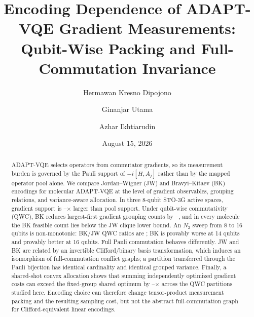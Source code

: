 \documentclass[aps,pra,twocolumn,superscriptaddress,nofootinbib,floatfix]{revtex4-2}
\begin{document}
\title{Encoding Dependence of ADAPT-VQE Gradient Measurements:\\
Qubit-Wise Packing and Full-Commutation Invariance}

\author{Hermawan Kresno Dipojono}
\author{Ginanjar Utama}
\author{Azhar Ikhtiarudin}
\date{August 15, 2026}

\begin{abstract}
ADAPT-VQE selects operators from commutator gradients, so its measurement burden is governed by the Pauli support of $-i[H,A_j]$ rather than by the mapped operator pool alone. We compare Jordan--Wigner (JW) and Bravyi--Kitaev (BK) encodings for molecular ADAPT-VQE at the level of gradient observables, grouping relations, and variance-aware allocation. In three 8-qubit STO-3G active spaces, gradient support is \GradPoolMin--\GradPoolMax$\times$ larger than pool support. Under qubit-wise commutativity (QWC), BK reduces largest-first gradient grouping counts by \QWCRedMin--\QWCRedMax, and in every molecule the BK feasible count lies below the JW clique lower bound. An $N_2$ sweep from 8 to 16 qubits is non-monotonic: BK/JW QWC ratios are \SweepRatios; BK is provably worse at 14 qubits and provably better at 16 qubits. Full Pauli commutation behaves differently. JW and BK are related by an invertible Clifford/binary basis transformation, which induces an isomorphism of full-commutation conflict graphs; a partition transferred through the Pauli bijection has identical cardinality and identical grouped variance. Finally, a shared-shot convex allocation shows that summing independently optimized gradient costs can exceed the fixed-group shared optimum by \SharedOverstatementMin--\SharedOverstatementMax$\times$ across the QWC partitions studied here. Encoding choice can therefore change tensor-product measurement packing and the resulting sampling cost, but not the abstract full-commutation graph for Clifford-equivalent linear encodings.
\end{abstract}
\end{document}

